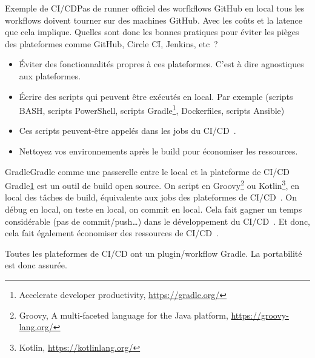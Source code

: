 \documentclass{beamer}
\begin{document}
    \begin{frame}{Exemple de CI/CD}{Pas de runner officiel des worfkflows GitHub en local}
        \transdissolve
        tous les workflows doivent tourner sur des machines GitHub.
        Avec les coûts et la latence que cela implique.
        \bigbreak
        Quelles sont donc les bonnes pratiques pour éviter les pièges des plateformes comme GitHub, Circle CI, Jenkins, etc~?
        \pause
        \begin{itemize}
            \item Éviter des fonctionnalités propres à ces plateformes.
            C'est à dire agnostiques aux plateformes.
            \item Écrire des scripts qui peuvent être exécutés en local.
            Par exemple (scripts BASH, scripts PowerShell, scripts Gradle\footnote{\label{gradle}Accelerate developer productivity, \url{https://gradle.org/}}, Dockerfiles, scripts Ansible)
            \item Ces scripts peuvent-être appelés dans les jobs du CI/CD~.
            \item Nettoyez vos environnements après le build pour économiser les ressources.
        \end{itemize}
    \end{frame}

    \begin{frame}{Gradle}{Gradle comme une passerelle entre le local et la plateforme de CI/CD}
        \transdissolve
        Gradle\cref{gradle} est un outil de build open source.
        On script en Groovy\footnote{\label{groovy}Groovy, A multi-faceted language for the Java platform, \url{https://groovy-lang.org/}} ou Kotlin\footnote{Kotlin, \url{https://kotlinlang.org/}}, en local des tâches de build, équivalente aux jobs des plateformes de CI/CD~.
        \bigbreak
        On débug en local, on teste en local, on commit en local.
        Cela fait gagner un temps considérable (pas de commit/push\ldots) dans le développement du CI/CD~.
        Et donc, cela fait également économiser des ressources de CI/CD~.
        \begin{dangercolorbox}
            Toutes les plateformes de CI/CD ont un plugin/workflow Gradle.
            La portabilité est donc assurée.
        \end{dangercolorbox}
    \end{frame}
\end{document}
